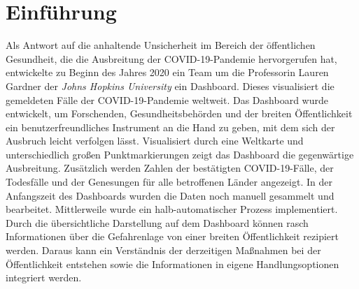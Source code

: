 \chapter{Einführung}
Als Antwort auf die anhaltende Unsicherheit im Bereich der öffentlichen Gesundheit, die die Ausbreitung der COVID-19-Pandemie hervorgerufen hat, 
entwickelte zu Beginn des Jahres 2020 ein Team um die Professorin Lauren Gardner der \textit{Johns Hopkins University} ein Dashboard. 
Dieses visualisiert die gemeldeten Fälle der COVID-19-Pandemie weltweit. Das Dashboard wurde entwickelt, um Forschenden, Gesundheitsbehörden und der breiten Öffentlichkeit 
ein benutzerfreundliches Instrument an die Hand zu geben, mit dem sich der Ausbruch leicht verfolgen lässt.
Visualisiert durch eine Weltkarte und unterschiedlich großen Punktmarkierungen zeigt das Dashboard die gegenwärtige Ausbreitung.
Zusätzlich werden Zahlen der bestätigten COVID-19-Fälle, der Todesfälle und der Genesungen für alle betroffenen Länder angezeigt\cite[Vgl.][533]{dong_interactive_2020}.
In der Anfangszeit des Dashboards wurden die Daten noch manuell gesammelt und bearbeitet. Mittlerweile wurde ein halb-automatischer Prozess implementiert.
Durch die übersichtliche Darstellung auf dem Dashboard können rasch Informationen über die Gefahrenlage von einer breiten Öffentlichkeit
rezipiert werden. Daraus kann ein Verständnis der derzeitigen Maßnahmen bei der Öffentlichkeit entstehen sowie die Informationen in eigene Handlungsoptionen
integriert werden.


